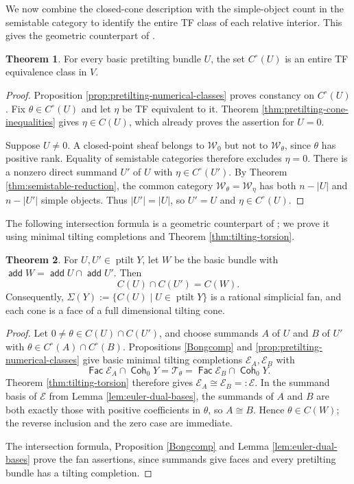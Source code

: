 \documentclass[a4paper,reqno]{amsart}
\def\E{\mathcal{E}}
\def\T{\mathcal{T}}
\def\W{\mathcal{W}}
\DeclareMathOperator{\add}{\mathsf{add}}
\DeclareMathOperator{\Fac}{\mathsf{Fac}}
\DeclareMathOperator{\Coh}{\mathsf{Coh}}
\DeclareMathOperator{\ptilt}{ptilt}
\theoremstyle{definition}
\newtheorem{Thm}{Theorem}[section]
\begin{document}
We now combine the closed-cone description with the simple-object count in the semistable category to identify the entire TF class of each relative interior. This gives the geometric counterpart of \cite[Theorem 3.11]{Asa21}.

\begin{Thm}\label{thm:tf-cones}
For every basic pretilting bundle $U$, the set $C^\circ(U)$ is an entire TF equivalence class in $V$.
\end{Thm}
\begin{proof}
Proposition \ref{prop:pretilting-numerical-classes} proves constancy on $C^\circ(U)$. Fix $\theta\in C^\circ(U)$ and let $\eta$ be TF equivalent to it. Theorem \ref{thm:pretilting-cone-inequalities} gives $\eta\in C(U)$, which already proves the assertion for $U=0$.

Suppose $U\ne0$. A closed-point sheaf belongs to $\W_0$ but not to $\W_\theta$, since $\theta$ has positive rank. Equality of semistable categories therefore excludes $\eta=0$. There is a nonzero direct summand $U'$ of $U$ with $\eta\in C^\circ(U')$. By Theorem \ref{thm:semistable-reduction}, the common category $\W_\theta=\W_\eta$ has both $n-|U|$ and $n-|U'|$ simple objects. Thus $|U'|=|U|$, so $U'=U$ and $\eta\in C^\circ(U)$.
\end{proof}

The following intersection formula is a geometric counterpart of \cite[Proposition 3.9(3)]{Asa21}; we prove it using minimal tilting completions and Theorem \ref{thm:tilting-torsion}.

\begin{Thm}\label{thm:tilting-fan}
For $U,U'\in\ptilt Y$, let $W$ be the basic bundle with $\add W=\add U\cap\add U'$. Then
\begin{equation}\label{eq:pretilting-cone-intersection}
C(U)\cap C(U')=C(W).
\end{equation}
Consequently, $\Sigma(Y):=\{C(U)\mid U\in\ptilt Y\}$ is a rational simplicial fan, and each cone is a face of a full dimensional tilting cone.
\end{Thm}
\begin{proof}
Let $0\ne\theta\in C(U)\cap C(U')$, and choose summands $A$ of $U$ and $B$ of $U'$ with $\theta\in C^\circ(A)\cap C^\circ(B)$. Propositions \ref{Bongcomp} and \ref{prop:pretilting-numerical-classes} give basic minimal tilting completions $\E_A,\E_B$ with
\[
\Fac\E_A\cap\Coh_0Y=\T_\theta=\Fac\E_B\cap\Coh_0Y.
\]
Theorem \ref{thm:tilting-torsion} therefore gives $\E_A\cong\E_B=:\E$. In the summand basis of $\E$ from Lemma \ref{lem:euler-dual-bases}, the summands of $A$ and $B$ are both exactly those with positive coefficients in $\theta$, so $A\cong B$. Hence $\theta\in C(W)$; the reverse inclusion and the zero case are immediate.

The intersection formula, Proposition \ref{Bongcomp} and Lemma \ref{lem:euler-dual-bases} prove the fan assertions, since summands give faces and every pretilting bundle has a tilting completion.
\end{proof}
\end{document}
